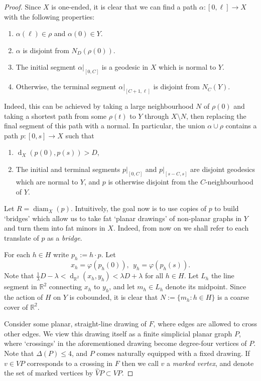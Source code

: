 \documentclass[10pt,a4paper]{amsart}
\DeclareMathOperator{\diam}{diam}
\DeclareMathOperator{\dist}{d}
\newcommand{\R}{\mathbb{R}}
\theoremstyle{definition}
\begin{document}
\begin{proof}
	Since $X$ is one-ended, it is clear that we can find a path $\alpha :[0,\ell] \to X$ with the following properties:
	\begin{enumerate}
		\item $\alpha(\ell) \in \rho$ and $\alpha(0) \in Y$.
            \item $\alpha$ is disjoint from $N_D(\rho(0))$.
		\item The initial segment $\alpha|_{[0,C]}$ is a geodesic in $X$ which is normal to $Y$.
		\item Otherwise, the terminal segment $\alpha|_{[C+1, \ell]}$ is disjoint from $N_{C}(Y)$.
	\end{enumerate}
	Indeed, this can be achieved by taking a large neighbourhood $N$ of $\rho(0)$ and taking a shortest path from some $\rho(t)$ to $Y$ through $X\setminus N$, then replacing the final segment of this path with a normal. 
	In particular, the union $\alpha \cup \rho$ contains a path $p : [0,s] \to X$ such that
	\begin{enumerate}
		\item $\dist_X(p(0), p(s)) > D$,
		\item The initial and terminal segments $p|_{[0,C]}$ and $p|_{[s-C , s]}$ are disjoint geodesics which are normal to $Y$, and $p$ is otherwise disjoint from the $C$-neighbourhood of $Y$. 
	\end{enumerate}	
    Let $R = \diam_X(p)$.
	Intuitively, the goal now is to use copies of $p$ to build `bridges' which allow us to take fat `planar drawings' of non-planar graphs in $Y$ and turn them into fat minors in $X$. Indeed, from now on we shall refer to each translate of $p$ as a \emph{bridge}. 

	 
	For each $h \in H$ write $p_h := h \cdot p$. 
	Let 
	$$
	x_h = \varphi(p_h(0)), \ \ y_h = \varphi(p_h(s)).
	$$
	Note that $\tfrac 1 \lambda D - \lambda < \dist_{\R^2}(x_h, y_h) < \lambda D + \lambda$ for all $h \in H$. 
	Let $L_h$ the line segment in $\R^2$ connecting $x_h$ to $y_h$, and let $m_h \in L_h$ denote its midpoint. Since the action of $H$ on $Y$ is cobounded, it is clear that $N := \{m_h : h \in H\}$ is a coarse cover of $\R^2$. 
	
	
	
	Consider some planar, straight-line drawing of $F$, where edges are allowed to cross other edges. We view this drawing itself as a finite simplicial planar graph $P$, where `crossings' in the aforementioned drawing become degree-four vertices of $P$. Note that $\Delta(P) \leq 4$, and $P$ comes naturally equipped with a fixed drawing. 
	If $v \in VP$ corresponds to a crossing in $F$ then we call $v$ a \textit{marked vertex}, and denote the set of marked vertices  by $\widehat VP \subset VP$. 


\end{proof}
\end{document}
